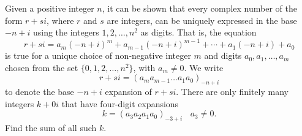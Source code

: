 Given a positive integer $n$, it can be shown that every complex number of the form $r+si$, where $r$ and $s$ are integers, can be uniquely expressed in the base $-n+i$ using the integers $1,2,\ldots,n^2$ as digits. That is, the equation\[ r+si=a_m(-n+i)^m+a_{m-1}(-n+i)^{m-1}+\cdots +a_1(-n+i)+a_0  \]is true for a unique choice of non-negative integer $m$ and digits $a_0,a_1,\ldots,a_m$ chosen from the set $\{0,1,2,\ldots,n^2\}$, with $a_m\ne 0$. We write \[ r+si=(a_ma_{m-1}\ldots a_1a_0)_{-n+i}  \]to denote the base $-n+i$ expansion of $r+si$. There are only finitely many integers $k+0i$ that have four-digit expansions \[ k=(a_3a_2a_1a_0)_{-3+i}~~~~a_3\ne 0.  \]Find the sum of all such $k$.